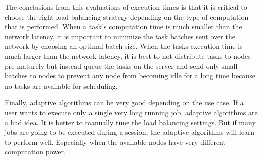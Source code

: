\documentclass[english]{uzhpub}
\begin{document}
The conclusions from this evaluations of execution times is that it is critical to choose the right load balancing strategy depending on the type of computation that is performed. When a task's computation time is much smaller than the network latency, it is important to minimize the task batches sent over the network by choosing an optimal batch size. When the tasks execution time is much larger than the network latency, it is best to not distribute tasks to nodes pre-maturely but instead queue the tasks on the server and send only small batches to nodes to prevent any node from becoming idle for a long time because no tasks are available for scheduling.

Finally, adaptive algorithms can be very good depending on the use case. If a user wants to execute only a single very long running job, adaptive algorithms are a bad idea. It is better to manually tune the load balancing settings. But if many jobs are going to be executed during a session, the adaptive algorithms will learn to perform well. Especially when the available nodes have very different computation power.

\newpage

\appendix


\end{document}
